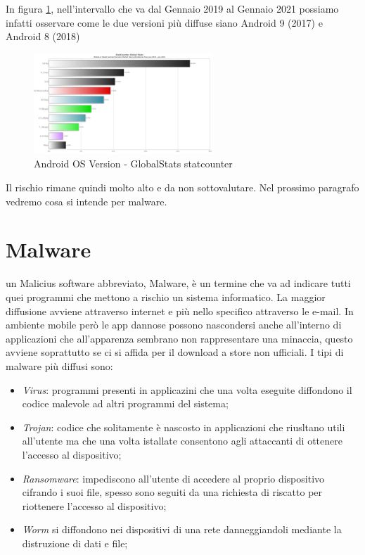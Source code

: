 In figura \ref{fig:os version}, nell'intervallo che va dal Gennaio 2019 al Gennaio 2021 possiamo infatti osservare come le due versioni più diffuse siano Android 9 (2017) e Android 8 (2018) 

    \begin{figure}[h]
        \centering
        \includegraphics[width=0.6\textwidth]{imgs/capitolo3/StatCounter-android_version-ww-monthly-201901-202101-bar.png}
        \caption{Android OS Version - GlobalStats statcounter}
        \label{fig:os version}
        \end{figure}
        \FloatBarrier %


Il rischio rimane quindi molto alto e da non sottovalutare. 
Nel prossimo paragrafo vedremo cosa si intende per malware. 
\section{Malware}
un Malicius software abbreviato, Malware, è un termine che va ad indicare tutti quei programmi che mettono a rischio un sistema informatico. La maggior diffusione avviene attraverso internet e più nello specifico attraverso le e-mail. In ambiente mobile però le app dannose possono nascondersi anche all'interno di applicazioni che all'apparenza sembrano non rappresentare una minaccia, questo avviene soprattutto se ci si affida per il download a store non ufficiali. I tipi di malware più diffusi sono: 
\begin{itemize}
    \item \textit{Virus}: programmi presenti in applicazini che una volta eseguite diffondono il codice malevole ad altri programmi del sistema;
    \item \textit{Trojan}: codice che solitamente è nascosto in applicazioni che riusltano utili all'utente ma che una volta istallate consentono agli attaccanti di ottenere l'accesso al dispositivo; 
    \item \textit{Ransomware}: impediscono all'utente di accedere al proprio dispositivo cifrando i suoi file, spesso sono seguiti da una richiesta di riscatto per riottenere l'accesso al dispositivo; 
    \item \textit{Worm} si diffondono nei dispositivi di una rete danneggiandoli mediante la distruzione di dati e file;
\end{itemize}

